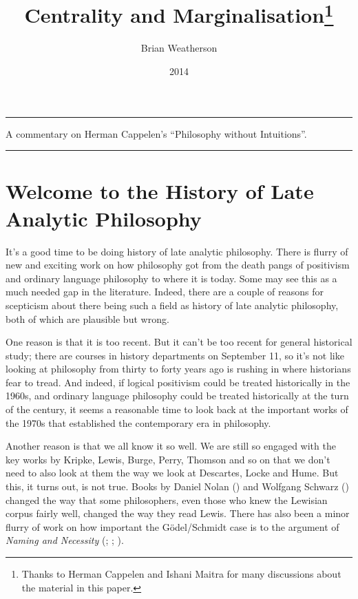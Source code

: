 \documentclass[
  10pt,
  letterpaper,
  DIV=11,
  numbers=noendperiod,
  twoside]{scrartcl}
\title{Centrality and Marginalisation\thanks{Thanks to Herman Cappelen
and Ishani Maitra for many discussions about the material in this
paper.}}
\author{Brian Weatherson}
\date{2014}
\renewenvironment{abstract}
 {\vspace{-1.25cm}
 \quotation\small\noindent\rule{\linewidth}{.5pt}\par\smallskip
 \noindent }
 {\par\noindent\rule{\linewidth}{.5pt}\endquotation}
\begin{document}
\maketitle
\begin{abstract}
A commentary on Herman Cappelen's ``Philosophy without Intuitions''.
\end{abstract}

\section{Welcome to the History of Late Analytic
Philosophy}\label{sec-Intro}

It's a good time to be doing history of late analytic philosophy. There
is flurry of new and exciting work on how philosophy got from the death
pangs of positivism and ordinary language philosophy to where it is
today. Some may see this as a much needed gap in the literature. Indeed,
there are a couple of reasons for scepticism about there being such a
field as history of late analytic philosophy, both of which are
plausible but wrong.

One reason is that it is too recent. But it can't be too recent for
general historical study; there are courses in history departments on
September 11, so it's not like looking at philosophy from thirty to
forty years ago is rushing in where historians fear to tread. And
indeed, if logical positivism could be treated historically in the
1960s, and ordinary language philosophy could be treated historically at
the turn of the century, it seems a reasonable time to look back at the
important works of the 1970s that established the contemporary era in
philosophy.

Another reason is that we all know it so well. We are still so engaged
with the key works by Kripke, Lewis, Burge, Perry, Thomson and so on
that we don't need to also look at them the way we look at Descartes,
Locke and Hume. But this, it turns out, is not true. Books by Daniel
Nolan () and Wolfgang Schwarz
() changed the way that some
philosophers, even those who knew the Lewisian corpus fairly well,
changed the way they read Lewis. There has also been a minor flurry of
work on how important the Gödel/Schmidt case is to the argument of
\emph{Naming and Necessity} (;
;
).
\end{document}
